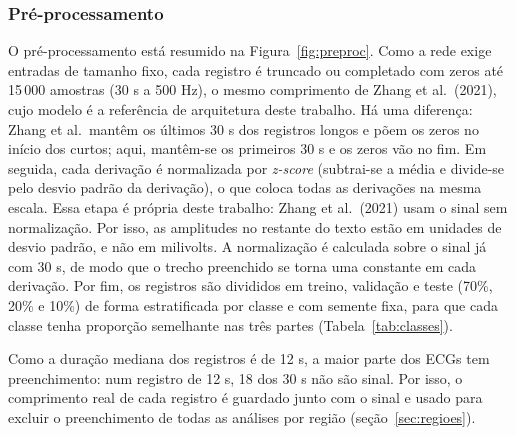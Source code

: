 \documentclass[11pt,a4paper]{article}
\begin{document}
\subsubsection{Pré-processamento}
O pré-processamento está resumido na Figura~\ref{fig:preproc}. Como a rede exige entradas de tamanho fixo, cada registro é truncado ou completado com zeros até 15\,000 amostras (30 s a 500 Hz), o mesmo comprimento de Zhang et al.\ (2021), cujo modelo é a referência de arquitetura deste trabalho. Há uma diferença: Zhang et al.\ mantêm os últimos 30 s dos registros longos e põem os zeros no início dos curtos; aqui, mantêm-se os primeiros 30 s e os zeros vão no fim. Em seguida, cada derivação é normalizada por \textit{z-score} (subtrai-se a média e divide-se pelo desvio padrão da derivação), o que coloca todas as derivações na mesma escala. Essa etapa é própria deste trabalho: Zhang et al.\ (2021) usam o sinal sem normalização. Por isso, as amplitudes no restante do texto estão em unidades de desvio padrão, e não em milivolts. A normalização é calculada sobre o sinal já com 30 s, de modo que o trecho preenchido se torna uma constante em cada derivação. Por fim, os registros são divididos em treino, validação e teste (70\%, 20\% e 10\%) de forma estratificada por classe e com semente fixa, para que cada classe tenha proporção semelhante nas três partes (Tabela~\ref{tab:classes}).

Como a duração mediana dos registros é de 12 s, a maior parte dos ECGs tem preenchimento: num registro de 12 s, 18 dos 30 s não são sinal. Por isso, o comprimento real de cada registro é guardado junto com o sinal e usado para excluir o preenchimento de todas as análises por região (seção~\ref{sec:regioes}).
\end{document}
